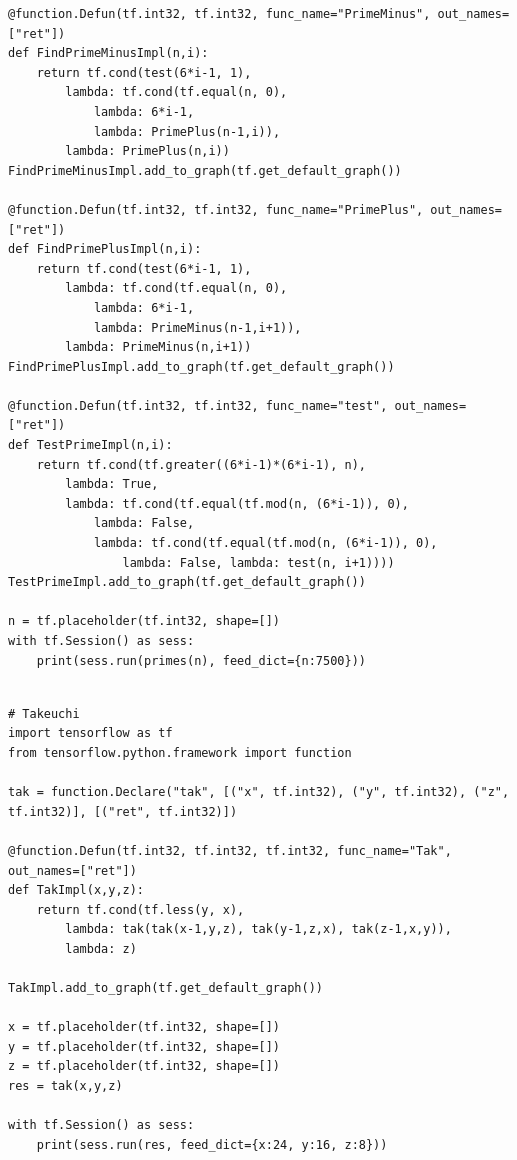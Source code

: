 \documentclass[ack,preface]{dithesis}
\begin{document}
\begin{appendix}
\begin{lstlisting}
@function.Defun(tf.int32, tf.int32, func_name="PrimeMinus", out_names=["ret"])
def FindPrimeMinusImpl(n,i):
	return tf.cond(test(6*i-1, 1),
		lambda: tf.cond(tf.equal(n, 0),
			lambda: 6*i-1,
			lambda: PrimePlus(n-1,i)),
		lambda: PrimePlus(n,i))
FindPrimeMinusImpl.add_to_graph(tf.get_default_graph())

@function.Defun(tf.int32, tf.int32, func_name="PrimePlus", out_names=["ret"])
def FindPrimePlusImpl(n,i):
	return tf.cond(test(6*i-1, 1),
		lambda: tf.cond(tf.equal(n, 0),
			lambda: 6*i-1,
			lambda: PrimeMinus(n-1,i+1)),
		lambda: PrimeMinus(n,i+1))
FindPrimePlusImpl.add_to_graph(tf.get_default_graph())

@function.Defun(tf.int32, tf.int32, func_name="test", out_names=["ret"])
def TestPrimeImpl(n,i):
	return tf.cond(tf.greater((6*i-1)*(6*i-1), n),
		lambda: True,
		lambda: tf.cond(tf.equal(tf.mod(n, (6*i-1)), 0),
			lambda: False,
			lambda: tf.cond(tf.equal(tf.mod(n, (6*i-1)), 0),
				lambda: False, lambda: test(n, i+1))))
TestPrimeImpl.add_to_graph(tf.get_default_graph())

n = tf.placeholder(tf.int32, shape=[])
with tf.Session() as sess:
	print(sess.run(primes(n), feed_dict={n:7500}))


\end{lstlisting}

\begin{lstlisting}
# Takeuchi
import tensorflow as tf
from tensorflow.python.framework import function

tak = function.Declare("tak", [("x", tf.int32), ("y", tf.int32), ("z", tf.int32)], [("ret", tf.int32)])

@function.Defun(tf.int32, tf.int32, tf.int32, func_name="Tak", out_names=["ret"])
def TakImpl(x,y,z):
	return tf.cond(tf.less(y, x),
        lambda: tak(tak(x-1,y,z), tak(y-1,z,x), tak(z-1,x,y)),
		lambda: z)

TakImpl.add_to_graph(tf.get_default_graph())

x = tf.placeholder(tf.int32, shape=[])
y = tf.placeholder(tf.int32, shape=[])
z = tf.placeholder(tf.int32, shape=[])
res = tak(x,y,z)

with tf.Session() as sess:
	print(sess.run(res, feed_dict={x:24, y:16, z:8}))
\end{lstlisting}


\end{appendix}


\end{document}
